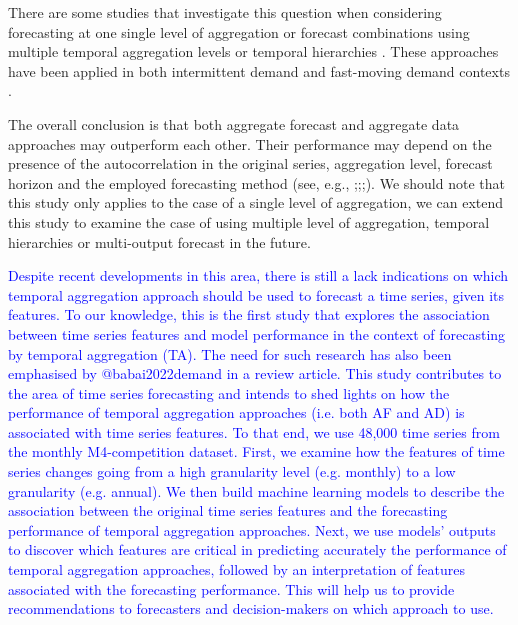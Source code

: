 \documentclass[preprint, 3p,
authoryear]{elsarticle} %
\begin{document}
There are some studies that investigate this question when considering
forecasting at one single level of aggregation
\citep{rostami2013demand, rostami2014note, kourentzes2017demand} or
forecast combinations using multiple temporal aggregation levels
\citep{kourentzes2014improving} or temporal hierarchies
\citep{athanasopoulos2017forecasting}. These approaches have been
applied \citep{nikolopoulos2011aggregate, petropoulos2014forecast} in
both intermittent demand \citep{nikolopoulos2021we} and fast-moving
demand contexts \citep{athanasopoulos2017forecasting}.

The overall conclusion is that both aggregate forecast and aggregate
data approaches may outperform each other. Their performance may depend
on the presence of the autocorrelation in the original series,
aggregation level, forecast horizon and the employed forecasting method
(see, e.g.,
\citet{boylan2016performance};\citet{rostami2021aggregate};\citet{rostami2014note};\citet{nikolopoulos2011aggregate}).
We should note that this study only applies to the case of a single
level of aggregation, we can extend this study to examine the case of
using multiple level of aggregation, temporal hierarchies or
multi-output forecast in the future.

\textcolor{blue}{Despite recent developments in this area, there is still a lack indications on which temporal aggregation approach should be used to forecast a time series, given its features. To our knowledge, this is the first study that explores the association between time series features and model performance in the context of forecasting by temporal aggregation (TA). The need for such research has also
been emphasised by @babai2022demand in a review article. This study contributes to the area of time series forecasting and intends to shed lights on how the performance of temporal aggregation approaches (i.e. both AF and AD) is associated with time series features. To that end, we use 48,000 time series from the monthly M4-competition dataset. First, we examine how the features of time series changes going from a high granularity level (e.g. monthly) to a low granularity (e.g. annual). We then build machine learning models to describe the association between the original time series features and the forecasting performance of temporal aggregation approaches. Next, we use models' outputs to discover which features are critical in predicting accurately the performance of temporal aggregation approaches, followed by an interpretation of features associated with the forecasting performance. This will help us to provide recommendations to forecasters and decision-makers on which approach to use.}
\end{document}
